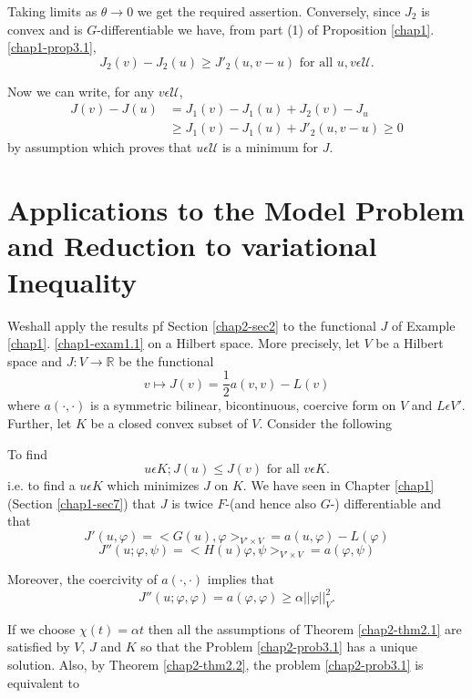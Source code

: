 Taking limits as $\theta \to 0$ we get the required assertion. Conversely, since $J_{2}$ is convex and is $G$-differentiable we have, from part (1) of Proposition \ref{chap1}. \ref{chap1-prop3.1},
$$
J_{2}(v) - J_{2}(u) \geq J'_{2} (u, v-u) \text{ for all } u, v \epsilon \mathcal{U}.
$$

Now we can write, for any $v \epsilon \mathcal{U}$,
\begin{align*}
J(v) - J(u) & = J_{1}(v) - J_{1}(u) + J_{2}(v) - J_{u}\\
& \geq J_{1}(v) - J_{1}(u) + J'_{2}(u, v-u) \geq 0
\end{align*}
by assumption which proves that $u \epsilon \mathcal{U}$ is a minimum for $J$.

\section[Applications to the Model Problem and...]{Applications to the
  Model Problem and Reduction to variational
  Inequality}\label{chap2-sec3} 
We\pageoriginale shall apply the results pf Section \ref{chap2-sec2} to the functional $J$ of Example \ref{chap1}. \ref{chap1-exam1.1} on a Hilbert space. More precisely, let $V$ be a Hilbert space and $J : V \to \mathbb{R}$ be the functional
$$
v \mapsto J(v) = \frac{1}{2}a(v, v) - L(v)
$$ 
where $a(\cdot , \cdot)$ is a symmetric bilinear, bicontinuous, coercive form on $V$ and $L \epsilon V'$. Further, let $K$ be a closed convex subset of $V$. Consider the following

\begin{problem}\label{chap2-prob3.1}
To find
$$
u \epsilon K ; J(u) \leq J(v) \text{ for all } v \epsilon K.
$$
i.e. to find a $u \epsilon K$ which minimizes $J$ on $K$. We have seen in Chapter \ref{chap1} (Section \ref{chap1-sec7}) that $J$ is twice $F$-(and hence also $G$-) differentiable and that 
$$
J'(u, \varphi) = <G(u) , \varphi>_{V' \times V} = a(u, \varphi) - L(\varphi)
$$
$$
J''(u; \varphi, \psi) = <H(u) \varphi, \psi>_{V' \times V} = a(\varphi, \psi)
$$

Moreover, the coercivity of $a(\cdot , \cdot)$ implies that
$$
J''(u ; \varphi, \varphi) = a (\varphi, \varphi) \geq \alpha ||\varphi||_{V}^{2}.
$$
\end{problem}

If we choose $\chi(t) = \alpha t$ then all the assumptions of Theorem \ref{chap2-thm2.1} are satisfied by $V$, $J$ and $K$ so that the Problem \ref{chap2-prob3.1} has a unique solution. Also, by Theorem \ref{chap2-thm2.2}, the problem \ref{chap2-prob3.1} is equivalent to

